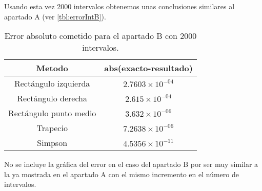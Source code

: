 Usando esta vez 2000 intervalos obtenemos unas conclusiones similares al apartado A (ver \autoref{tbl:errorIntB}).
\begin{table}
\begin{center}
\begin{tabular}{ |c|c| } 
 \hline 
 Metodo & abs(exacto-resultado) \\ 
 \hline \hline
 Rectángulo izquierda &  $2.7603\times10^{-04}$ \\ 
 \hline
 Rectángulo derecha &  $2.615\times10^{-04}$ \\ 
 \hline
 Rectángulo punto medio &  $3.632\times10^{-06}$ \\ 
 \hline
 Trapecio &  $7.2638\times10^{-06}$ \\ 
 \hline
 Simpson &  $4.5356\times10^{-11}$ \\ 
 \hline
\end{tabular}
\end{center}
\caption{Error absoluto cometido para el apartado B con 2000 intervalos.}
\label{tbl:errorIntB}
\end{table}

No se incluye la gráfica del error en el caso del apartado B por ser muy similar a la ya mostrada en el apartado A con el mismo incremento en el número de intervalos.